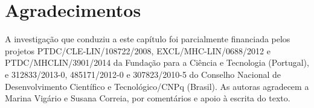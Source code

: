\documentclass[output=paper]{LSP/langsci}
\begin{document}
\section*{Agradecimentos}
A investigação que conduziu a este capítulo foi parcialmente financiada pelos projetos PTDC\slash CLE-LIN\slash 108722\slash 2008, EXCL\slash MHC-LIN\slash 0688\slash 2012 e PTDC\slash MHCLIN\slash 3901\slash 2014 da Fundação para a Ciência e Tecnologia (Portugal), e 312833\slash 2013-0, 485171\slash 2012-0 e 307823\slash 2010-5 do Conselho Nacional de Desenvolvimento Científico e Tecnológico\slash CNPq (Brasil). As autoras agradecem a Marina Vigário e Susana Correia, por comentários e apoio à escrita do texto.


{\sloppy
\printbibliography[heading=subbibliography,notkeyword=this]
}
\end{document}
